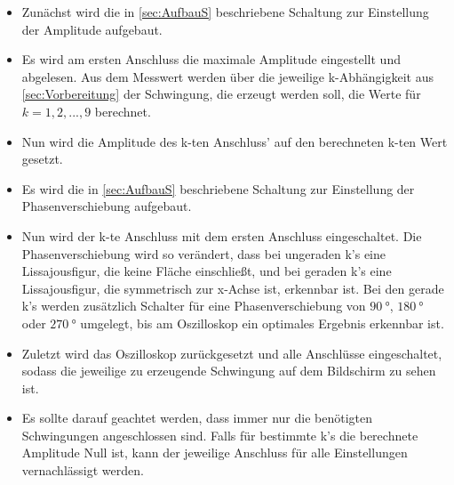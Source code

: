 \begin{itemize}

  \item Zunächst wird die in \ref{sec:AufbauS} beschriebene Schaltung zur
  Einstellung der Amplitude aufgebaut.

  \item Es wird am ersten Anschluss die maximale Amplitude eingestellt und
  abgelesen. Aus dem Messwert werden über die jeweilige k-Abhängigkeit aus
  \ref{sec:Vorbereitung} der
  Schwingung, die erzeugt werden soll, die Werte für $k=1,2,...,9$ berechnet.

  \item Nun wird die Amplitude des k-ten Anschluss' auf den berechneten k-ten
  Wert gesetzt.

  \item Es wird die in \ref{sec:AufbauS} beschriebene Schaltung zur Einstellung
  der Phasenverschiebung aufgebaut.

  \item Nun wird der k-te Anschluss mit dem ersten Anschluss eingeschaltet.
  Die Phasenverschiebung wird so verändert, dass bei ungeraden k's eine
  Lissajousfigur, die keine Fläche einschließt, und bei geraden k's
  eine Lissajousfigur, die symmetrisch zur x-Achse ist, erkennbar ist.
  Bei den gerade k's werden zusätzlich Schalter für eine
  Phasenverschiebung von $\SI{90}{\degree}$, $\SI{180}{\degree}$ oder
  $\SI{270}{\degree}$
  umgelegt, bis am Oszilloskop ein optimales Ergebnis erkennbar ist.

  \item Zuletzt wird das Oszilloskop zurückgesetzt und alle Anschlüsse
  eingeschaltet, sodass die jeweilige zu erzeugende Schwingung auf dem
  Bildschirm zu sehen ist.

  \item Es sollte darauf geachtet werden, dass immer nur die benötigten
  Schwingungen angeschlossen sind. Falls für bestimmte k's die berechnete
  Amplitude Null ist, kann der jeweilige Anschluss für alle Einstellungen
  vernachlässigt werden.

\end{itemize}
